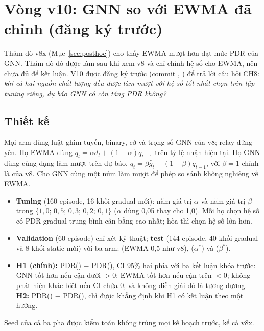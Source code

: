 \section{Vòng v10: GNN so với EWMA đã chỉnh (đăng ký trước)}\label{sec:r10}
Thăm dò v8x (Mục~\ref{sec:posthoc}) cho thấy EWMA mượt hơn đạt mức PDR của GNN. Thăm dò đó được làm sau khi xem v8 và chỉ chỉnh hệ số cho EWMA, nên chưa đủ để kết luận. V10 được đăng ký trước (commit , ) để trả lời câu hỏi CH8: \emph{khi cả hai nguồn chất lượng đều được làm mượt với hệ số tốt nhất chọn trên tập tuning riêng, dự báo GNN có còn tăng PDR không?}

\subsection{Thiết kế}
Mọi arm dùng luật ghim tuyến, binary, cờ và trọng số GNN của v8; relay đứng yên. Họ EWMA dùng $q_t=\alpha d_t+(1-\alpha)q_{t-1}$ trên tỷ lệ nhận hiện tại. Họ GNN dùng cùng dạng làm mượt trên dự báo, $q_t=\beta\hat g_t+(1-\beta)q_{t-1}$, với $\beta=1$ chính là  của v8. Cho GNN cùng một núm làm mượt để phép so sánh không nghiêng về EWMA.
\begin{itemize}
\item \textbf{Tuning} (160 episode, 16 khối gradual mới): năm giá trị $\alpha$ và năm giá trị $\beta$ trong $\{1{,}0;\,0{,}5;\,0{,}3;\,0{,}2;\,0{,}1\}$ ($\alpha$ dùng 0,05 thay cho 1,0). Mỗi họ chọn hệ số có PDR gradual trung bình cân bằng cao nhất; hòa thì chọn hệ số lớn hơn.
\item \textbf{Validation} (60 episode) chỉ xét kỹ thuật; \textbf{test} (144 episode, 40 khối gradual và 8 khối static mới) với ba arm:  (EWMA 0,5 như v8),  ($\alpha^\ast$) và  ($\beta^\ast$).
\item \textbf{H1 (chính):} PDR() $-$ PDR(), CI 95\% hai phía với ba kết luận khóa trước: GNN tốt hơn nếu cận dưới $>0$; EWMA tốt hơn nếu cận trên $<0$; không phát hiện khác biệt nếu CI chứa 0, và không diễn giải đó là tương đương. \textbf{H2:} PDR() $-$ PDR(), chỉ được khẳng định khi H1 có kết luận theo một hướng.
\end{itemize}
Seed của cả ba pha được kiểm toán không trùng mọi kế hoạch trước, kể cả v8x.

